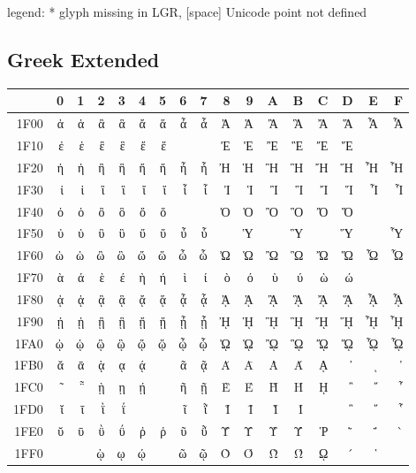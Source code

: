 \documentclass[a4paper]{article}
\begin{document}
\noindent
legend: * glyph missing in LGR, [space] Unicode point not defined


\subsection{Greek Extended}

\greekscript
\begin{tabular}{rrrrrrrrrrrrrrrrr}
\toprule
      & 0 & 1 & 2 & 3 & 4 & 5 & 6 & 7 & 8 & 9 & A & B & \textlatin C & D & E & F\\
\midrule
\textlatin{1F00} & ἀ & ἁ & ἂ & ἃ & ἄ & ἅ & ἆ & ἇ & Ἀ & Ἁ & Ἂ & Ἃ & Ἄ & Ἅ & Ἆ & Ἇ\\
\textlatin{1F10} & ἐ & ἑ & ἒ & ἓ & ἔ & ἕ &   &   & Ἐ & Ἑ & Ἒ & Ἓ & Ἔ & Ἕ &   &  \\
\textlatin{1F20} & ἠ & ἡ & ἢ & ἣ & ἤ & ἥ & ἦ & ἧ & Ἠ & Ἡ & Ἢ & Ἣ & Ἤ & Ἥ & Ἦ & Ἧ\\
\textlatin{1F30} & ἰ & ἱ & ἲ & ἳ & ἴ & ἵ & ἶ & ἷ & Ἰ & Ἱ & Ἲ & Ἳ & Ἴ & Ἵ & Ἶ & Ἷ\\
\textlatin{1F40} & ὀ & ὁ & ὂ & ὃ & ὄ & ὅ &   &   & Ὀ & Ὁ & Ὂ & Ὃ & Ὄ & Ὅ &   &  \\
\textlatin{1F50} & ὐ & ὑ & ὒ & ὓ & ὔ & ὕ & ὖ & ὗ &   & Ὑ &   & Ὓ &   & Ὕ &   & Ὗ\\
\textlatin{1F60} & ὠ & ὡ & ὢ & ὣ & ὤ & ὥ & ὦ & ὧ & Ὠ & Ὡ & Ὢ & Ὣ & Ὤ & Ὥ & Ὦ & Ὧ\\
\textlatin{1F70} & ὰ & ά & ὲ & έ & ὴ & ή & ὶ & ί & ὸ & ό & ὺ & ύ & ὼ & ώ &   &  \\
\textlatin{1F80} & ᾀ & ᾁ & ᾂ & ᾃ & ᾄ & ᾅ & ᾆ & ᾇ & ᾈ & ᾉ & ᾊ & ᾋ & ᾌ & ᾍ & ᾎ & ᾏ\\
\textlatin{1F90} & ᾐ & ᾑ & ᾒ & ᾓ & ᾔ & ᾕ & ᾖ & ᾗ & ᾘ & ᾙ & ᾚ & ᾛ & ᾜ & ᾝ & ᾞ & ᾟ\\
\textlatin{1FA0} & ᾠ & ᾡ & ᾢ & ᾣ & ᾤ & ᾥ & ᾦ & ᾧ & ᾨ & ᾩ & ᾪ & ᾫ & ᾬ & ᾭ & ᾮ & ᾯ\\
\textlatin{1FB0} & ᾰ & ᾱ & ᾲ & ᾳ & ᾴ &   & ᾶ & ᾷ & Ᾰ & Ᾱ & Ὰ & Ά & ᾼ & ᾽ & ι & ᾿\\
\textlatin{1FC0} & ῀ & ῁ & ῂ & ῃ & ῄ &   & ῆ & ῇ & Ὲ & Έ & Ὴ & Ή & ῌ & ῍ & ῎ & ῏\\
\textlatin{1FD0} & ῐ & ῑ & ῒ & ΐ &   &   & ῖ & ῗ & Ῐ & Ῑ & Ὶ & Ί &   & ῝ & ῞ & ῟\\
\textlatin{1FE0} & ῠ & ῡ & ῢ & ΰ & ῤ & ῥ & ῦ & ῧ & Ῠ & Ῡ & Ὺ & Ύ & Ῥ & ῭ & ΅ & `\\
\textlatin{1FF0} &   &   & ῲ & ῳ & ῴ &   & ῶ & ῷ & Ὸ & Ό & Ὼ & Ώ & ῼ & ´ & ῾ &  \\
\bottomrule
\end{tabular}
\latintext 
\end{document}
